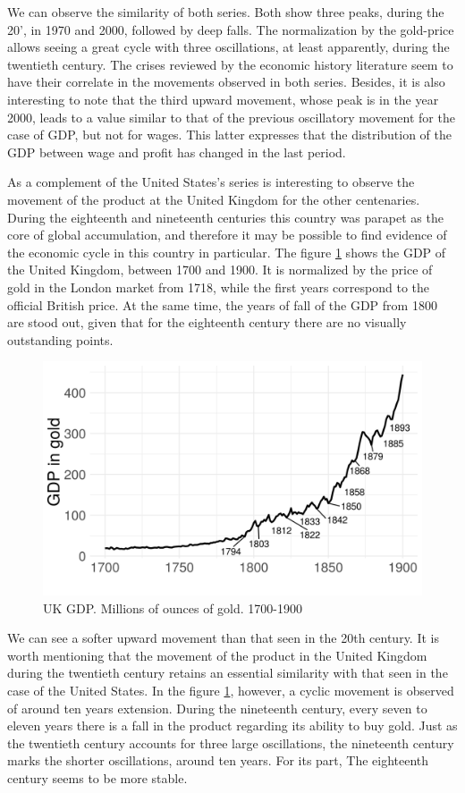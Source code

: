 \documentclass[a4paper,10cpi]{article}
\begin{document}
	We can observe the similarity of both series. Both show three peaks, during the 20', in 1970 and 2000, followed by deep falls. The normalization by the gold-price allows seeing a great cycle with three oscillations, at least apparently, during the twentieth century. The crises reviewed by the economic history literature seem to have their correlate in the movements observed in both series. Besides, it is also interesting to note that the third upward movement, whose peak is in the year 2000, leads to a value similar to that of the previous oscillatory movement for the case of GDP, but not for wages. This latter expresses that the distribution of the GDP between wage and profit has changed in the last period.
	
	As a complement of the United States's series is interesting to observe the movement of the product at the United Kingdom for the other centenaries. During the eighteenth and nineteenth centuries this country was parapet as the core of global accumulation, and therefore it may be possible to find evidence of the economic cycle in this country in particular. The figure \ref{fig:uk_gdp} shows the GDP of the United Kingdom, between 1700 and 1900. It is normalized by the price of gold in the London market from 1718, while the first years correspond to the official British price. At the same time, the years of fall of the GDP from 1800 are stood out, given that for the eighteenth century there are no visually outstanding points.
	
	\begin{figure}[H]
		\centering
		\includegraphics[width=0.75\linewidth]{uk_gdp_en.png}
		\caption{UK GDP. Millions of ounces of gold. 1700-1900} 
		\label{fig:uk_gdp}
	\end{figure}
	
	
	We can see a softer upward movement than that seen in the 20th century. It is worth mentioning that the movement of the product in the United Kingdom during the twentieth century retains an essential similarity with that seen in the case of the United States. In the figure \ref{fig:uk_gdp}, however, a cyclic movement is observed of around ten years extension. During the nineteenth century, every seven to eleven years there is a fall in the product regarding its ability to buy gold. Just as the twentieth century accounts for three large oscillations, the nineteenth century marks the shorter oscillations, around ten years. For its part, The eighteenth century seems to be more stable.
	
\end{document}
